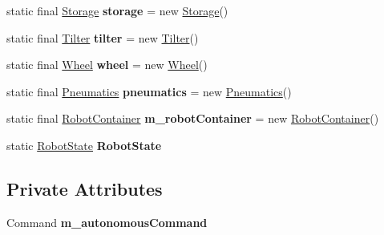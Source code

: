 \begin{DoxyCompactItemize}
static final \mbox{\hyperlink{classfrc_1_1robot_1_1subsystems_1_1_storage}{Storage}} {\bfseries storage} = new \mbox{\hyperlink{classfrc_1_1robot_1_1subsystems_1_1_storage}{Storage}}()
\item 
\mbox{\label{classfrc_1_1robot_1_1_robot_a24101d552b71ecf12a99d1f66bd39766}} 
static final \mbox{\hyperlink{classfrc_1_1robot_1_1subsystems_1_1_tilter}{Tilter}} {\bfseries tilter} = new \mbox{\hyperlink{classfrc_1_1robot_1_1subsystems_1_1_tilter}{Tilter}}()
\item 
\mbox{\label{classfrc_1_1robot_1_1_robot_ae64705622fc34e839e18b18f692b960b}} 
static final \mbox{\hyperlink{classfrc_1_1robot_1_1subsystems_1_1_wheel}{Wheel}} {\bfseries wheel} = new \mbox{\hyperlink{classfrc_1_1robot_1_1subsystems_1_1_wheel}{Wheel}}()
\item 
\mbox{\label{classfrc_1_1robot_1_1_robot_a1ea5c8c32ab1b54845b2e34e2f1c5f16}} 
static final \mbox{\hyperlink{classfrc_1_1robot_1_1subsystems_1_1_pneumatics}{Pneumatics}} {\bfseries pneumatics} = new \mbox{\hyperlink{classfrc_1_1robot_1_1subsystems_1_1_pneumatics}{Pneumatics}}()
\item 
\mbox{\label{classfrc_1_1robot_1_1_robot_adc5e5687ee5227a99a16fd650416e4c1}} 
static final \mbox{\hyperlink{classfrc_1_1robot_1_1_robot_container}{Robot\+Container}} {\bfseries m\+\_\+robot\+Container} = new \mbox{\hyperlink{classfrc_1_1robot_1_1_robot_container}{Robot\+Container}}()
\item 
\mbox{\label{classfrc_1_1robot_1_1_robot_ad1917b7c2eb3be5c7137584f267fc2e2}} 
static \mbox{\hyperlink{enumfrc_1_1robot_1_1enums_1_1_robot_state}{Robot\+State}} {\bfseries Robot\+State}
\end{DoxyCompactItemize}
\subsection*{Private Attributes}
\begin{DoxyCompactItemize}
\item 
\mbox{\label{classfrc_1_1robot_1_1_robot_a93c2e826bc711136e2a88fb9af756cd1}} 
Command {\bfseries m\+\_\+autonomous\+Command}
\end{DoxyCompactItemize}


